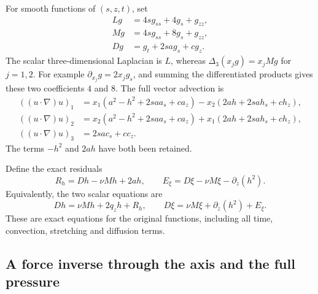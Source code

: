 For smooth functions of \((s,z,t)\), set
\begin{equation}\label{eq:aft-operators}
 \begin{split}
 Lg&=4s g_{ss}+4g_s+g_{zz},\\
 Mg&=4s g_{ss}+8g_s+g_{zz},\\
 Dg&=g_t+2s a g_s+c g_z.
 \end{split}
\end{equation}
The scalar three-dimensional Laplacian is \(L\), whereas
\(\Delta_3(x_jg)=x_jMg\) for \(j=1,2\).  For example
\(\partial_{x_j}g=2x_jg_s\), and summing the differentiated products
gives these two coefficients \(4\) and \(8\).  The full vector advection
is
\begin{equation}\label{eq:aft-advection}
 \begin{split}
 ((u\cdot\nabla)u)_1
 &=x_1(a^2-h^2+2s a a_s+c a_z)
   -x_2(2ah+2s a h_s+c h_z),\\
 ((u\cdot\nabla)u)_2
 &=x_2(a^2-h^2+2s a a_s+c a_z)
   +x_1(2ah+2s a h_s+c h_z),\\
 ((u\cdot\nabla)u)_3&=2s a c_s+c c_z.
 \end{split}
\end{equation}
The terms \(-h^2\) and \(2ah\) have both been retained.

Define the exact residuals
\begin{equation}\label{eq:aft-residuals}
 R_h=Dh-\nu Mh+2ah,\qquad
 E_\xi=D\xi-\nu M\xi-\partial_z(h^2).
\end{equation}
Equivalently, the two scalar equations are
\begin{equation}\label{eq:aft-scalar-equations}
 Dh=\nu Mh+2q_z h+R_h,\qquad
 D\xi=\nu M\xi+\partial_z(h^2)+E_\xi.
\end{equation}
These are exact equations for the original functions, including all
time, convection, stretching and diffusion terms.

\subsection{A force inverse through the axis and the full pressure}

